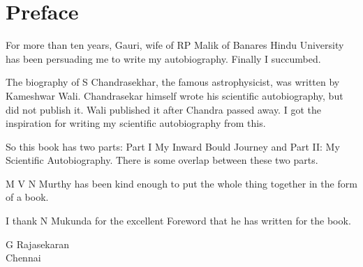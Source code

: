 
\chapter*{Preface}

For more than ten years, Gauri, wife of RP Malik of Banares Hindu University has been persuading me to write my autobiography. Finally I succumbed.

The biography of S Chandrasekhar, the famous astrophysicist, was
written by Kameshwar Wali. Chandrasekar himself wrote his scientific
autobiography, but did not publish it. Wali published it after Chandra
passed away. I got the inspiration for writing my scientific autobiography
from this.

So this book has two parts: Part I My Inward Bould Journey and Part II:
My Scientific Autobiography. There is some overlap between these two
parts.

M V N Murthy has been kind enough to put the whole thing together in the 
form of a book.

I thank N Mukunda for the excellent Foreword that he has written for 
the book.

\vskip 1cm
\begin{flushright}
G Rajasekaran\\
Chennai
\end{flushright}
